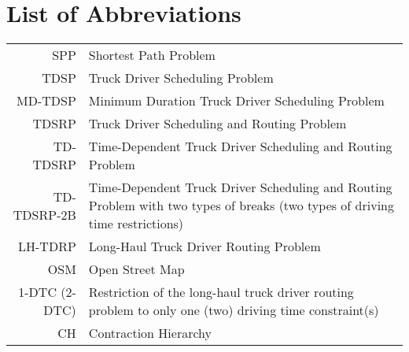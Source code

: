 

\appendix

{}	%
{}	%

\section{List of Abbreviations}
\label{app:abb}

\begin{tabular}{rp{}}
	SPP           & Shortest Path Problem                                                                                                        \\
	TDSP          & Truck Driver Scheduling Problem                                                                                              \\
	MD-TDSP       & Minimum Duration Truck Driver Scheduling Problem                                                                             \\
	TDSRP         & Truck Driver Scheduling and Routing Problem                                                                                  \\
	TD-TDSRP      & Time-Dependent Truck Driver Scheduling and Routing Problem                                                                   \\
	TD-TDSRP-2B   & Time-Dependent Truck Driver Scheduling and Routing Problem with two types of breaks (two types of driving time restrictions) \\
	LH-TDRP       & Long-Haul Truck Driver Routing Problem                                                                                       \\
	OSM           & Open Street Map                                                                                                              \\
	1-DTC (2-DTC) & Restriction of the long-haul truck driver routing problem to only one (two) driving time constraint(s)                       \\
	CH            & Contraction Hierarchy                                                                                                        \\
\end{tabular}



